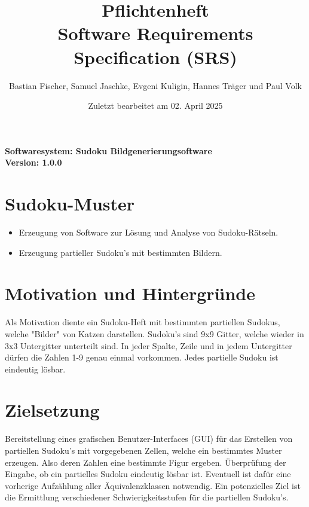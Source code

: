\documentclass[11pt,a4paper]{article}
\begin{document}
\title{Pflichtenheft\\[1ex] \large Software Requirements Specification (SRS)}

\author{Bastian Fischer, Samuel Jaschke, Evgeni Kuligin, Hannes Träger und Paul Volk}
\date{Zuletzt bearbeitet am 02. April 2025}
\maketitle


\noindent\textbf{Softwaresystem: Sudoku Bildgenerierungsoftware}\\
\textbf{Version: 1.0.0}
\section{Sudoku-Muster}
\begin{itemize}
\item Erzeugung von Software zur Lösung und Analyse von Sudoku-Rätseln.
\item Erzeugung partieller Sudoku's mit bestimmten Bildern.
\end{itemize}


\section{Motivation und Hintergründe}

Als Motivation diente ein Sudoku-Heft mit bestimmten partiellen Sudokus, welche "Bilder" von Katzen darstellen. Sudoku's sind 9x9 Gitter, welche wieder in 3x3 Untergitter unterteilt sind. In jeder Spalte, Zeile und in jedem Untergitter dürfen die Zahlen 1-9 genau einmal vorkommen. Jedes partielle Sudoku ist eindeutig lösbar.

\section{Zielsetzung}

Bereitstellung eines grafischen Benutzer-Interfaces (GUI) für das Erstellen von partiellen Sudoku's mit vorgegebenen Zellen, welche ein bestimmtes Muster erzeugen. Also deren Zahlen eine bestimmte Figur ergeben. Überprüfung der Eingabe, ob ein partielles Sudoku eindeutig lösbar ist. Eventuell ist dafür eine vorherige Aufzählung aller Äquivalenzklassen notwendig. Ein potenzielles Ziel ist die Ermittlung verschiedener Schwierigkeitsstufen für die partiellen Sudoku's.
\end{document}
